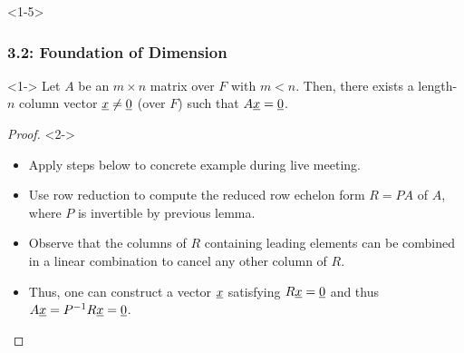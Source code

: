 \documentclass[10pt,english,aspectratio=169]{beamer}
\begin{document}
\begin{frame}<1-5> \frametitle{3.2: Foundation of Dimension}

\begin{lemma}<1->
Let $A$ be an $m \times n$ matrix over $F$ with $m<n$.
Then, there exists a length-$n$ column vector $\underline{x} \neq \underline{0}$ (over $F$) such that $A \underline{x} = \underline{0}$.
\end{lemma}

\begin{proof}<2->
\begin{itemize}
\item<2-> Apply steps below to concrete example during live meeting.

\item<3-> Use row reduction to compute the reduced row echelon form $R=PA$ of $A$, where $P$ is invertible by previous lemma.

\item<4-> Observe that the columns of $R$ containing leading elements can be combined in a linear combination to cancel any other column of $R$.

\item<5-> Thus, one can construct a vector $\underline{x}$ satisfying $R\underline{x}=\underline{0}$ and thus $A \underline{x} = P^{-1} R \underline{x} = \underline{0}$. \hfill \qedhere
\end{itemize}
\end{proof}


\end{frame}
\end{document}
